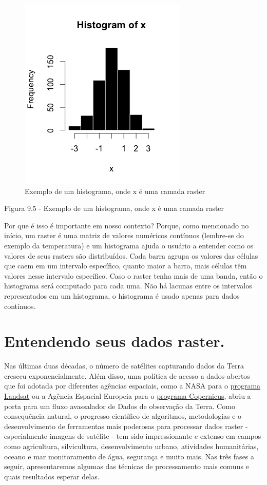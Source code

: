 \documentclass[
  portuguese,
]{krantz}
\begin{document}
\begin{figure}
\centering
\includegraphics{media/modulo9/fig95.png}
\caption{Exemplo de um histograma, onde x é uma camada raster}
\end{figure}

Figura 9.5 - Exemplo de um histograma, onde x é uma camada raster

Por que é isso é importante em nosso contexto? Porque, como mencionado no início, um raster é uma matriz de valores numéricos contínuos (lembre-se do exemplo da temperatura) e um histograma ajuda o usuário a entender como os valores de seus rasters são distribuídos. Cada barra agrupa os valores das células que caem em um intervalo específico, quanto maior a barra, mais células têm valores nesse intervalo específico. Caso o raster tenha mais de uma banda, então o histograma será computado para cada uma. Não há lacunas entre os intervalos representados em um histograma, o histograma é usado apenas para dados contínuos.

\hypertarget{entendendo-seus-dados-raster.}{%
\section{Entendendo seus dados raster.}\label{entendendo-seus-dados-raster.}}

Nas últimas duas décadas, o número de satélites capturando dados da Terra cresceu exponencialmente. Além disso, uma política de acesso a dados abertos que foi adotada por diferentes agências espaciais, como a NASA para o \href{https://www.usgs.gov/core-science-systems/nli/landsat/landsat-data-access?qt-science_support_page_related_con=0\#qt-science_support_page_related_con}{programa Landsat} ou a Agência Espacial Europeia para o \href{https://www.copernicus.eu/en/access-data}{programa Copernicus}, abriu a porta para um fluxo avassalador de Dados de observação da Terra. Como consequência natural, o progresso científico de algoritmos, metodologias e o desenvolvimento de ferramentas mais poderosas para processar dados raster - especialmente imagens de satélite - tem sido impressionante e extenso em campos como agricultura, silvicultura, desenvolvimento urbano, atividades humanitárias, oceano e mar monitoramento de água, segurança e muito mais. Nas três fases a seguir, apresentaremos algumas das técnicas de processamento mais comuns e quais resultados esperar delas.
\end{document}
